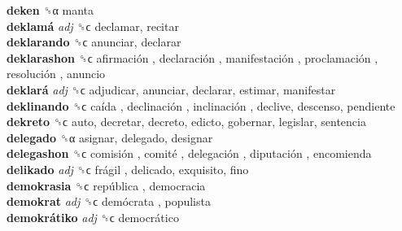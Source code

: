 \textbf{deken} ␝α  manta  \\
\textbf{deklamá} \emph{adj}  ␝ϲ  declamar, recitar  \\
\textbf{deklarando} ␝ϲ  anunciar, declarar  \\
\textbf{deklarashon} ␝ϲ   afirmación ,  declaración ,  manifestación ,  proclamación ,  resolución , anuncio  \\
\textbf{deklará} \emph{adj}  ␝ϲ  adjudicar, anunciar, declarar, estimar, manifestar  \\
\textbf{deklinando} ␝ϲ   caída ,  declinación ,  inclinación , declive, descenso, pendiente  \\
\textbf{dekreto} ␝ϲ  auto, decretar, decreto, edicto, gobernar, legislar, sentencia  \\
\textbf{delegado} ␝α  asignar, delegado, designar  \\
\textbf{delegashon} ␝ϲ   comisión ,  comité ,  delegación ,  diputación , encomienda  \\
\textbf{delikado} \emph{adj}  ␝ϲ   frágil , delicado, exquisito, fino  \\
\textbf{demokrasia} ␝ϲ   república , democracia  \\
\textbf{demokrat} \emph{adj}  ␝ϲ   demócrata , populista  \\
\textbf{demokrátiko} \emph{adj}  ␝ϲ   democrático   \\
